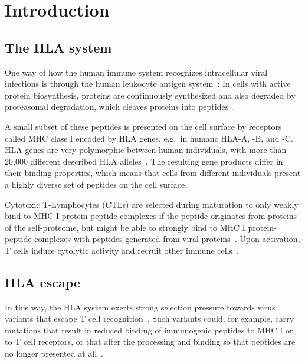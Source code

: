 \documentclass[fleqn,11pt]{SelfArx} %
\affiliation{\textsuperscript{1}\textit{Bioinformatics \& Computational Biophysics, Faculty of Biology, University of Duisburg-Essen, 45117 Essen, Germany}} %
\begin{document}
\flushbottom %

\maketitle %

{
  \hypersetup{linkcolor=black}
  \tableofcontents
}

\section{Introduction}

\subsection{The HLA system}

One way of how the human immune system recognizes intracellular viral infections is through the human leukocyte antigen system~\cite{Germain1994}: In cells with active protein biosynthesis, proteins are continuously synthesized and also degraded by proteasomal degradation, which cleaves proteins into peptides~\cite{Goldberg2002}.

A small subset of these peptides is presented on the cell surface by receptors called MHC class I encoded by HLA genes, e.g.\ in humanc HLA-A, -B, and -C. HLA genes are very polymorphic between human individuals, with more than 20,000 different described HLA alleles~\cite{Robinson2014}. The resulting gene products differ in their binding properties, which means that cells from different individuals present a highly diverse set of peptides on the cell surface.

Cytotoxic T-Lymphocytes (CTLs) are selected during maturation to only weakly bind to MHC I protein-peptide complexes if the peptide originates from proteins of the self-proteome, but might be able to strongly bind to MHC I protein-peptide complexes with peptides generated from viral proteins~\cite{Murata2007}. Upon activation, T cells induce cytolytic activity and recruit other immune cells~\cite{Harty2000}.

\subsection{HLA escape}
In this way, the HLA system exerts strong selection pressure towards virus variants that escape T cell recognition~\cite{Borrow1997}. Such variants could, for example, carry mutations that result in reduced binding of immunogenic peptides to MHC I or to T cell receptors, or that alter the processing and binding so that peptides are no longer presented at all~\cite{Yewdell2002}.
\end{document}
